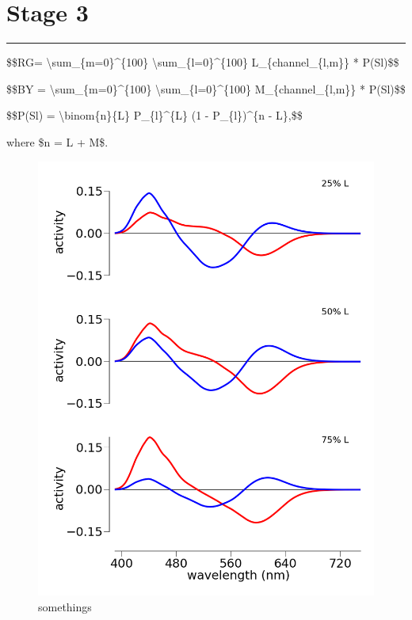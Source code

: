 \section{Stage 3}

\begin{center}\rule{3in}{0.4pt}\end{center}

\$\$RG= \textbackslash{}sum\_\{m=0\}\^{}\{100\}
\textbackslash{}sum\_\{l=0\}\^{}\{100\} L\_\{channel\_\{l,m\}\} *
P(S\textbar{}l)\$\$

\$\$BY = \textbackslash{}sum\_\{m=0\}\^{}\{100\}
\textbackslash{}sum\_\{l=0\}\^{}\{100\} M\_\{channel\_\{l,m\}\} *
P(S\textbar{}l)\$\$

\$\$P(S\textbar{}l) = \textbackslash{}binom\{n\}\{L\} P\_\{l\}\^{}\{L\}
(1 - P\_\{l\})\^{}\{n - L\},\$\$

where \$n = L + M\$.

\begin{figure}[htbp]
\centering
\includegraphics{../presentations/static/figures/colorModel/PercentL.png}
\caption{somethings}
\end{figure}

